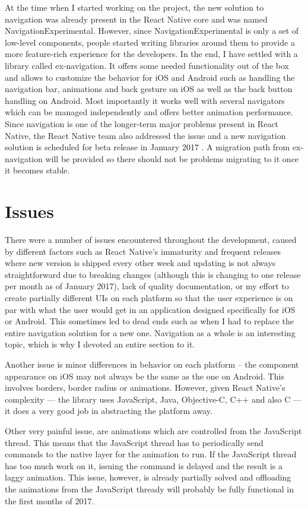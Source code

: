 At the time when I started working on the project, the new solution to navigation was already present in the React Native core and was named NavigationExperimental. However, since NavigationExperimental is only a set of low-level components, people started writing libraries around them to provide a more feature-rich experience for the developers. In the end, I have settled with a library called ex-navigation. It offers some needed functionality out of the box and allows to customize the behavior for iOS and Android such as handling the navigation bar, animations and back gesture on iOS as well as the back button handling on Android. Most importantly it works well with several navigators which can be managed independently and offers better animation performance. Since navigation is one of the longer-term major problems present in React Native, the React Native team also addressed the issue and a new navigation solution is scheduled for beta release in January 2017 \cite{exnav}. A migration path from ex-navigation will be provided so there should not be problems migrating to it once it becomes stable.

\section{Issues}

There were a number of issues encountered throughout the development, caused by different factors such as React Native's immaturity and frequent releases where new version is shipped every other week and updating is not always straightforward due to breaking changes (although this is changing to one release per month as of January 2017), lack of quality documentation, or my effort to create partially different UIs on each platform so that the user experience is on par with what the user would get in an application designed specifically for iOS or Android. This sometimes led to dead ends such as when I had to replace the entire navigation solution for a new one. Navigation as a whole is an interesting topic, which is why I devoted an entire section to it.


Another issue is minor differences in behavior on each platform -- the component appearance on iOS may not always be the same as the one on Android. This involves borders, border radius or animations. However, given React Native's complexity --- the library uses JavaScript, Java, Objective-C, C++ and also C --- it does a very good job in abstracting the platform away.


Other very painful issue, are animations which are controlled from the JavaScript thread. This means that the JavaScript thread has to periodically send commands to the native layer for the animation to run. If the JavaScript thread has too much work on it, issuing the command is delayed and the result is a laggy animation. This issue, however, is already partially solved and offloading the animations from the JavaScript thready will probably be fully functional in the first months of 2017.

